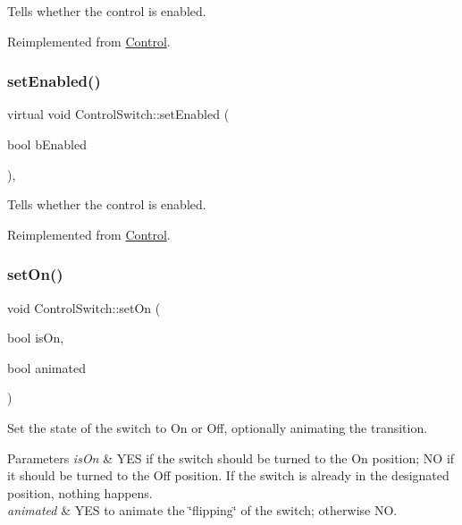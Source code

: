 Tells whether the control is enabled. 

Reimplemented from \hyperlink{classControl_a55339ae920182245d5ec114c33f4b1fd}{Control}.

\mbox{\label{classControlSwitch_a47191d986db5cb5c95a7b2171d483784}} 
\subsubsection{\texorpdfstring{set\+Enabled()}{setEnabled()}\hspace{0.1cm}{\footnotesize\ttfamily [2/2]}}
{\footnotesize\ttfamily virtual void Control\+Switch\+::set\+Enabled (\begin{DoxyParamCaption}\item[{bool}]{b\+Enabled }\end{DoxyParamCaption})\hspace{0.3cm}{\ttfamily [override]}, {\ttfamily [virtual]}}

Tells whether the control is enabled. 

Reimplemented from \hyperlink{classControl_a55339ae920182245d5ec114c33f4b1fd}{Control}.

\mbox{\label{classControlSwitch_a3e696f55493149e7c6aebf4134304071}} 
\subsubsection{\texorpdfstring{set\+On()}{setOn()}\hspace{0.1cm}{\footnotesize\ttfamily [1/2]}}
{\footnotesize\ttfamily void Control\+Switch\+::set\+On (\begin{DoxyParamCaption}\item[{bool}]{is\+On,  }\item[{bool}]{animated }\end{DoxyParamCaption})}

Set the state of the switch to On or Off, optionally animating the transition.


\begin{DoxyParams}{Parameters}
{\em is\+On} & Y\+ES if the switch should be turned to the On position; NO if it should be turned to the Off position. If the switch is already in the designated position, nothing happens. \\
\hline
{\em animated} & Y\+ES to animate the \char`\"{}flipping\char`\"{} of the switch; otherwise NO. \\
\hline
\end{DoxyParams}
\mbox{\label{classControlSwitch_a3e696f55493149e7c6aebf4134304071}} 
